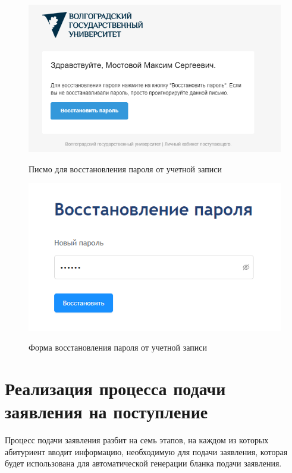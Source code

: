 \begin{figure}[H]
\begin{center}
\includegraphics[width=0.9\hsize]{fig/recovery-pass.png}\\[2mm]
\caption{Писмо для восстановления пароля от учетной записи}\label{fig:recoverypass}
\end{center}
\end{figure}

\begin{figure}[H]
\begin{center}
\includegraphics[width=0.9\hsize]{fig/recovery-pass-form.png}\\[2mm]
\caption{Форма восстановления пароля от учетной записи}\label{fig:recoverypassform}
\end{center}
\end{figure}

\section{Реализация процесса подачи заявления на поступление}

Процесс подачи заявления разбит на семь этапов, на каждом из которых абитуриент вводит информацию, необходимую для подачи заявления, которая будет использована для автоматической генерации бланка подачи заявления.

